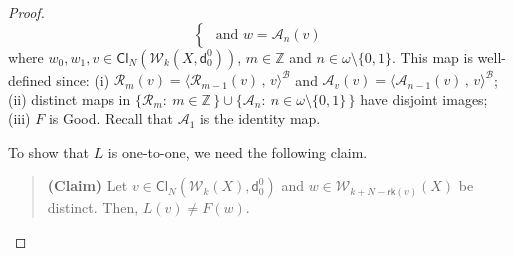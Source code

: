 \documentclass[10pt,a4paper]{amsart}
\begin{document}
\begin{proof}
\[\begin{cases}
                     \mbox{  and   }      w  =       \mathcal{A}_n  \left(   v \right)                                   
\end{cases}
\]
where   $   w_0,  w_1,  v   \in   \mathsf{Cl}_{N}  \left(  \mathcal{W}_{k}  \left( X   ,  \mathsf{d}^0_0   \right)   \right)     $, 
$  m  \in  \mathbb{Z}  $  and  $  n \in  \omega  \setminus  \lbrace 0, 1  \rbrace  $. 
This map is well-defined since: 
(i)   $   \mathcal{R}_m  \left(   v \right)    =  \langle    \mathcal{R}_{m-1}  \left(   v \right)     \,  ,   \,  v  \rangle^{  \mathcal{B} }  $  
and  
 $   \mathcal{A}_v  \left(   v \right)    =  \langle    \mathcal{A}_{n-1}  \left(   v \right)     \,  ,   \,  v  \rangle^{  \mathcal{B} }  $; 
 (ii) distinct maps in    $   \lbrace  \mathcal{R}_m   :  \   m  \in  \mathbb{Z} \,   \rbrace   \cup 
 \lbrace  \mathcal{A}_n :  \   n  \in    \omega  \setminus \lbrace 0, 1   \rbrace  \,   \rbrace       $
 have disjoint images; 
 (iii)  $F$ is  \textsf{Good}.
Recall that    $  \mathcal{A}_1  $  is  the identity map. 










To show that $L$ is one-to-one,  we need the following claim. 

   
   \begin{quote} {\bf (Claim)} \;\;\;\;\;\;    
   Let    $   v  \in    \mathsf{Cl}_{N}  \left(  \mathcal{W}_{k}  \left( X  \right)     ,  \mathsf{d}^0_0     \right)   $     and 
   $  w  \in  \mathcal{W}_{k + N- \mathsf{rk}  \left( v  \right)  }  \left( X  \right)    $
   be distinct. 
Then,    $ L(v)   \neq   F(w) $.
 \end{quote}  
 

\end{proof}
\end{document}
